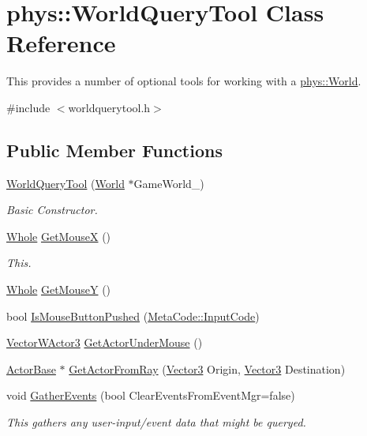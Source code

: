 \hypertarget{classphys_1_1WorldQueryTool}{
\section{phys::WorldQueryTool Class Reference}
\label{d8/d69/classphys_1_1WorldQueryTool}
}


This provides a number of optional tools for working with a \hyperlink{classphys_1_1World}{phys::World}.  




{\ttfamily \#include $<$worldquerytool.h$>$}

\subsection*{Public Member Functions}
\begin{DoxyCompactItemize}
\item 
\hyperlink{classphys_1_1WorldQueryTool_a6b156ab7ea6236402c40467da7f11c0d}{WorldQueryTool} (\hyperlink{classphys_1_1World}{World} $\ast$GameWorld\_\-)
\begin{DoxyCompactList}\small\item\em Basic Constructor. \item\end{DoxyCompactList}\item 
\hyperlink{namespacephys_a460f6bc24c8dd347b05e0366ae34f34a}{Whole} \hyperlink{classphys_1_1WorldQueryTool_a55721f152fb117fdfb8bc6d20af6b1dc}{GetMouseX} ()
\begin{DoxyCompactList}\small\item\em This. \item\end{DoxyCompactList}\item 
\hyperlink{namespacephys_a460f6bc24c8dd347b05e0366ae34f34a}{Whole} \hyperlink{classphys_1_1WorldQueryTool_ac2d8517db7305157c1393320f434751b}{GetMouseY} ()
\item 
bool \hyperlink{classphys_1_1WorldQueryTool_ae12be78aeb3b5a2caf05b9220909bc86}{IsMouseButtonPushed} (\hyperlink{classphys_1_1MetaCode_a3e501cbb5bf0f6f1fdb7211465bda8d8}{MetaCode::InputCode})
\item 
\hyperlink{classphys_1_1VectorWActor3}{VectorWActor3} \hyperlink{classphys_1_1WorldQueryTool_a85c3bcafc9ceea4ed485ff457d7b1f7b}{GetActorUnderMouse} ()
\item 
\hyperlink{classphys_1_1ActorBase}{ActorBase} $\ast$ \hyperlink{classphys_1_1WorldQueryTool_a70cb78186d7c4fafcbf17b8ccde4bab2}{GetActorFromRay} (\hyperlink{classphys_1_1Vector3}{Vector3} Origin, \hyperlink{classphys_1_1Vector3}{Vector3} Destination)
\item 
void \hyperlink{classphys_1_1WorldQueryTool_ae387ff047f3cdf408d8959b8cbf4cc57}{GatherEvents} (bool ClearEventsFromEventMgr=false)
\begin{DoxyCompactList}\small\item\em This gathers any user-\/input/event data that might be queryed. \item\end{DoxyCompactList}\end{DoxyCompactItemize}


